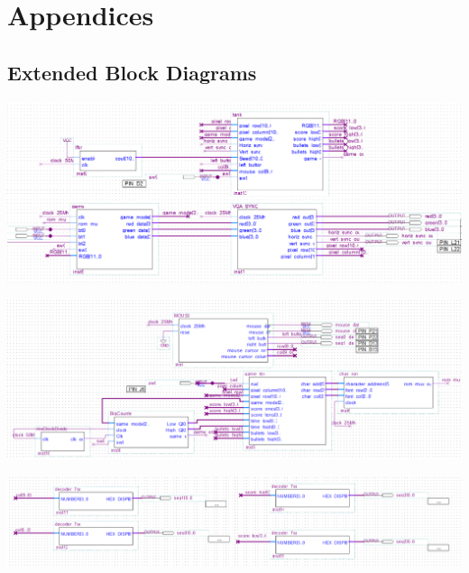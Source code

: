 \documentclass[a4paper,10pt,twoside]{article}
\begin{document}
\section{Appendices}

\subsection{Extended Block Diagrams}

\includegraphics[width=1\textwidth]{appendix1.png}

\includegraphics[width=1\textwidth]{appendix2.png}

\includegraphics[width=1\textwidth]{appendix3.png}
\end{document}
